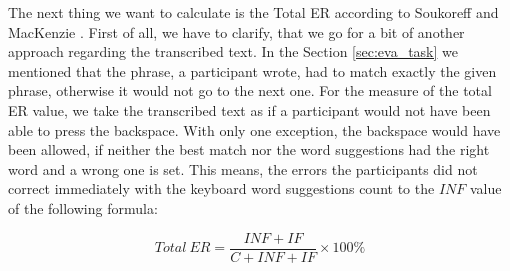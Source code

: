 The next thing we want to calculate is the Total ER according to Soukoreff and MacKenzie \cite{10.1145/642611.642632}. First of all, we have to clarify, that we go for a bit of another approach regarding the transcribed text. In the Section \ref{sec:eva_task} we mentioned that the phrase, a participant wrote, had to match exactly the given phrase, otherwise it would not go to the next one. For the measure of the total ER value, we take the transcribed text as if a participant would not have been able to press the backspace. With only one exception, the backspace would have been allowed, if neither the best match nor the word suggestions had the right word and a wrong one is set. This means, the errors the participants did not correct immediately with the keyboard word suggestions count to the $INF$ value of the following formula: 

\begin{equation}
    Total\ ER = \frac{INF + IF}{C + INF + IF} \times 100\%
\end{equation}

